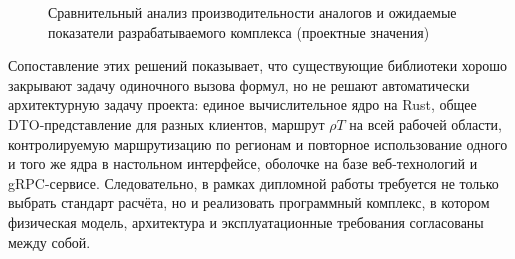 \begin{figure}[htbp]
    \centering
    \caption{Сравнительный анализ производительности аналогов и ожидаемые показатели разрабатываемого комплекса (проектные значения)}
    \label{fig:expected_performance}
\end{figure}

Сопоставление этих решений показывает,
что существующие библиотеки хорошо закрывают задачу одиночного вызова формул,
но не решают автоматически архитектурную задачу проекта:
единое вычислительное ядро на Rust,
общее DTO-представление для разных клиентов,
маршрут $\rho T$ на всей рабочей области,
контролируемую маршрутизацию по регионам
и повторное использование одного и того же ядра
в настольном интерфейсе, оболочке на базе веб-технологий и gRPC-сервисе.
Следовательно, в рамках дипломной работы требуется
не только выбрать стандарт расчёта,
но и реализовать программный комплекс,
в котором физическая модель, архитектура и эксплуатационные требования
согласованы между собой.
